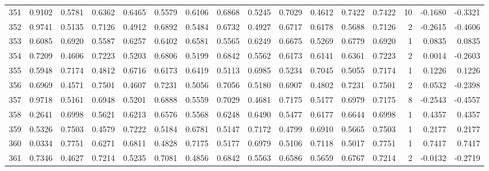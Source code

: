 \begin{tabular}{lrrrrrrrrrrrrrrr}
351 &      0.9102 &  0.5781 &  0.6362 &  0.6465 &  0.5579 &  0.6106 &  0.6868 &  0.5245 &  0.7029 &  0.4612 &   0.7422 &     0.7422 &     10 &                   -0.1680 &                    -0.3321 \\
352 &      0.9741 &  0.5135 &  0.7126 &  0.4912 &  0.6892 &  0.5484 &  0.6732 &  0.4927 &  0.6717 &  0.6178 &   0.5688 &     0.7126 &      2 &                   -0.2615 &                    -0.4606 \\
353 &      0.6085 &  0.6920 &  0.5587 &  0.6257 &  0.6402 &  0.6581 &  0.5565 &  0.6249 &  0.6675 &  0.5269 &   0.6779 &     0.6920 &      1 &                    0.0835 &                     0.0835 \\
354 &      0.7209 &  0.4606 &  0.7223 &  0.5203 &  0.6806 &  0.5199 &  0.6842 &  0.5562 &  0.6173 &  0.6141 &   0.6361 &     0.7223 &      2 &                    0.0014 &                    -0.2603 \\
355 &      0.5948 &  0.7174 &  0.4812 &  0.6716 &  0.6173 &  0.6419 &  0.5113 &  0.6985 &  0.5234 &  0.7045 &   0.5055 &     0.7174 &      1 &                    0.1226 &                     0.1226 \\
356 &      0.6969 &  0.4571 &  0.7501 &  0.4607 &  0.7231 &  0.5056 &  0.7056 &  0.5180 &  0.6907 &  0.4802 &   0.7231 &     0.7501 &      2 &                    0.0532 &                    -0.2398 \\
357 &      0.9718 &  0.5161 &  0.6948 &  0.5201 &  0.6888 &  0.5559 &  0.7029 &  0.4681 &  0.7175 &  0.5177 &   0.6979 &     0.7175 &      8 &                   -0.2543 &                    -0.4557 \\
358 &      0.2641 &  0.6998 &  0.5621 &  0.6213 &  0.6576 &  0.5568 &  0.6248 &  0.6490 &  0.5477 &  0.6177 &   0.6644 &     0.6998 &      1 &                    0.4357 &                     0.4357 \\
359 &      0.5326 &  0.7503 &  0.4579 &  0.7222 &  0.5184 &  0.6781 &  0.5147 &  0.7172 &  0.4799 &  0.6910 &   0.5665 &     0.7503 &      1 &                    0.2177 &                     0.2177 \\
360 &      0.0334 &  0.7751 &  0.6271 &  0.6811 &  0.4828 &  0.7175 &  0.5177 &  0.6979 &  0.5106 &  0.7118 &   0.5017 &     0.7751 &      1 &                    0.7417 &                     0.7417 \\
361 &      0.7346 &  0.4627 &  0.7214 &  0.5235 &  0.7081 &  0.4856 &  0.6842 &  0.5563 &  0.6586 &  0.5659 &   0.6767 &     0.7214 &      2 &                   -0.0132 &                    -0.2719 \\

\end{tabular}
